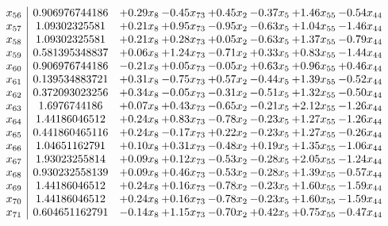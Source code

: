 \documentclass[8pt]{article}
\begin{document}
\[\begin{array}{c| c c@{\hskip 2pt} c@{\hskip 2pt} c@{\hskip 2pt} c@{\hskip 2pt} c@{\hskip 2pt} c@{\hskip 2pt} }
 x_{56}   &  0.906976744186 & +  0.29 x_{8} & -0.45 x_{73} & +  0.45 x_{2} & -0.37 x_{5} & +  1.46 x_{55} & -0.54 x_{44}\\
 x_{57}   &  1.09302325581 & +  0.21 x_{8} & +  0.95 x_{73} & -0.95 x_{2} & -0.63 x_{5} & +  1.04 x_{55} & -1.46 x_{44}\\
 x_{58}   &  1.09302325581 & +  0.21 x_{8} & +  0.28 x_{73} & +  0.05 x_{2} & -0.63 x_{5} & +  1.37 x_{55} & -0.79 x_{44}\\
 x_{59}   &  0.581395348837 & +  0.06 x_{8} & +  1.24 x_{73} & -0.71 x_{2} & +  0.33 x_{5} & +  0.83 x_{55} & -1.44 x_{44}\\
 x_{60}   &  0.906976744186 & -0.21 x_{8} & +  0.05 x_{73} & -0.05 x_{2} & +  0.63 x_{5} & +  0.96 x_{55} & +  0.46 x_{44}\\
 x_{61}   &  0.139534883721 & +  0.31 x_{8} & -0.75 x_{73} & +  0.57 x_{2} & -0.44 x_{5} & +  1.39 x_{55} & -0.52 x_{44}\\
 x_{62}   &  0.372093023256 & +  0.34 x_{8} & -0.05 x_{73} & -0.31 x_{2} & -0.51 x_{5} & +  1.32 x_{55} & -0.50 x_{44}\\
 x_{63}   &  1.6976744186 & +  0.07 x_{8} & +  0.43 x_{73} & -0.65 x_{2} & -0.21 x_{5} & +  2.12 x_{55} & -1.26 x_{44}\\
 x_{64}   &  1.44186046512 & +  0.24 x_{8} & +  0.83 x_{73} & -0.78 x_{2} & -0.23 x_{5} & +  1.27 x_{55} & -1.26 x_{44}\\
 x_{65}   &  0.441860465116 & +  0.24 x_{8} & -0.17 x_{73} & +  0.22 x_{2} & -0.23 x_{5} & +  1.27 x_{55} & -0.26 x_{44}\\
 x_{66}   &  1.04651162791 & +  0.10 x_{8} & +  0.31 x_{73} & -0.48 x_{2} & +  0.19 x_{5} & +  1.35 x_{55} & -1.06 x_{44}\\
 x_{67}   &  1.93023255814 & +  0.09 x_{8} & +  0.12 x_{73} & -0.53 x_{2} & -0.28 x_{5} & +  2.05 x_{55} & -1.24 x_{44}\\
 x_{68}   &  0.930232558139 & +  0.09 x_{8} & +  0.46 x_{73} & -0.53 x_{2} & -0.28 x_{5} & +  1.39 x_{55} & -0.57 x_{44}\\
 x_{69}   &  1.44186046512 & +  0.24 x_{8} & +  0.16 x_{73} & -0.78 x_{2} & -0.23 x_{5} & +  1.60 x_{55} & -1.59 x_{44}\\
 x_{70}   &  1.44186046512 & +  0.24 x_{8} & +  0.16 x_{73} & -0.78 x_{2} & -0.23 x_{5} & +  1.60 x_{55} & -1.59 x_{44}\\
 x_{71}   &  0.604651162791 & -0.14 x_{8} & +  1.15 x_{73} & -0.70 x_{2} & +  0.42 x_{5} & +  0.75 x_{55} & -0.47 x_{44}\\

\end{array}\]
\end{document}
